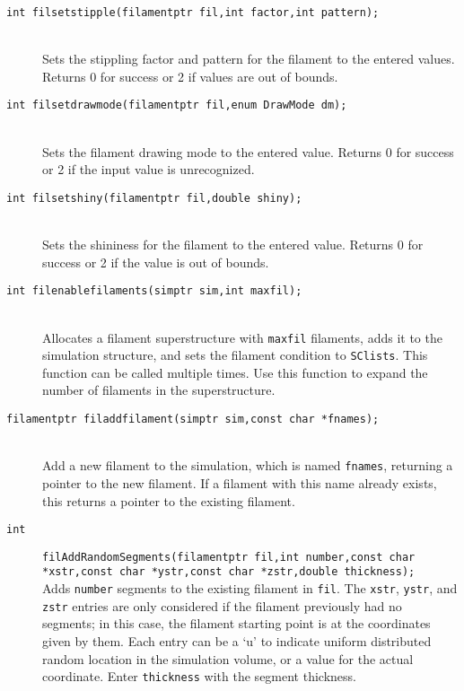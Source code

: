 \documentclass {book}
\begin{document}
\begin{description}
\item[\texttt{int filsetstipple(filamentptr fil,int factor,int pattern);}]
\hfill \\
Sets the stippling factor and pattern for the filament to the entered values.  Returns 0 for success or 2 if values are out of bounds.

\item[\texttt{int filsetdrawmode(filamentptr fil,enum DrawMode dm);}]
\hfill \\
Sets the filament drawing mode to the entered value.  Returns 0 for success or 2 if the input value is unrecognized.

\item[\texttt{int filsetshiny(filamentptr fil,double shiny);}]
\hfill \\
Sets the shininess for the filament to the entered value.  Returns 0 for success or 2 if the value is out of bounds.

\item[\texttt{int filenablefilaments(simptr sim,int maxfil);}]
\hfill \\
Allocates a filament superstructure with \texttt{maxfil} filaments, adds it to the simulation structure, and sets the filament condition to \texttt{SClists}.  This function can be called multiple times.  Use this function to expand the number of filaments in the superstructure.

\item[\texttt{filamentptr filaddfilament(simptr sim,const char *fnames);}]
\hfill \\
Add a new filament to the simulation, which is named \texttt{fnames}, returning a pointer to the new filament.  If a filament with this name already exists, this returns a pointer to the existing filament.

\item[\texttt{int}]
\texttt{filAddRandomSegments(filamentptr fil,int number,const char *xstr,const char *ystr,const char *zstr,double thickness);}
\hfill \\
Adds \texttt{number} segments to the existing filament in \texttt{fil}.  The \texttt{xstr}, \texttt{ystr}, and \texttt{zstr} entries are only considered if the filament previously had no segments; in this case, the filament starting point is at the coordinates given by them.  Each entry can be a `u' to indicate uniform distributed random location in the simulation volume, or a value for the actual coordinate.  Enter \texttt{thickness} with the segment thickness.


\end{description}
\end{document}

